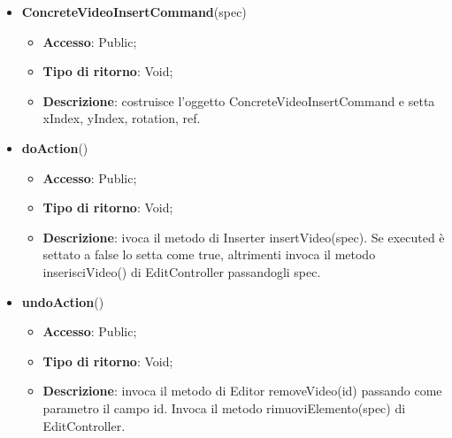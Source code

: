 {{{	
	\begin{itemize}
		\item \textbf{ConcreteVideoInsertCommand}(spec)
		\begin{itemize}
			\item \textbf{Accesso}: Public;
			\item \textbf{Tipo di ritorno}: Void;
			\item \textbf{Descrizione}: costruisce l’oggetto ConcreteVideoInsertCommand e setta xIndex, yIndex, rotation, ref.
		\end{itemize}
		\item \textbf{doAction}()
		\begin{itemize}
			\item \textbf{Accesso}: Public;
			\item \textbf{Tipo di ritorno}: Void;
			\item \textbf{Descrizione}: ivoca il metodo di Inserter insertVideo(spec). Se executed è settato a false lo setta come true, altrimenti invoca il metodo inserisciVideo() di EditController passandogli spec.
		\end{itemize}
		\item \textbf{undoAction}()
		\begin{itemize}
			\item \textbf{Accesso}: Public;
			\item \textbf{Tipo di ritorno}: Void;
			\item \textbf{Descrizione}: invoca il metodo di Editor removeVideo(id) passando come parametro il campo id. Invoca il metodo rimuoviElemento(spec) di EditController.
		\end{itemize}
	\end{itemize}
	}

}}
